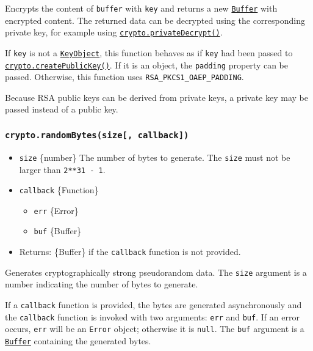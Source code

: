 Encrypts the content of \texttt{buffer} with \texttt{key} and returns a
new \href{buffer.md}{\texttt{Buffer}} with encrypted content. The
returned data can be decrypted using the corresponding private key, for
example using
\hyperref[cryptoprivatedecryptprivatekey-buffer]{\texttt{crypto.privateDecrypt()}}.

If \texttt{key} is not a \hyperref[class-keyobject]{\texttt{KeyObject}},
this function behaves as if \texttt{key} had been passed to
\hyperref[cryptocreatepublickeykey]{\texttt{crypto.createPublicKey()}}.
If it is an object, the \texttt{padding} property can be passed.
Otherwise, this function uses \texttt{RSA\_PKCS1\_OAEP\_PADDING}.

Because RSA public keys can be derived from private keys, a private key
may be passed instead of a public key.

\subsubsection{\texorpdfstring{\texttt{crypto.randomBytes(size{[},\ callback{]})}}{crypto.randomBytes(size{[}, callback{]})}}\label{crypto.randombytessize-callback}

\begin{itemize}
\tightlist
\item
  \texttt{size} \{number\} The number of bytes to generate. The
  \texttt{size} must not be larger than \texttt{2**31\ -\ 1}.
\item
  \texttt{callback} \{Function\}

  \begin{itemize}
  \tightlist
  \item
    \texttt{err} \{Error\}
  \item
    \texttt{buf} \{Buffer\}
  \end{itemize}
\item
  Returns: \{Buffer\} if the \texttt{callback} function is not provided.
\end{itemize}

Generates cryptographically strong pseudorandom data. The \texttt{size}
argument is a number indicating the number of bytes to generate.

If a \texttt{callback} function is provided, the bytes are generated
asynchronously and the \texttt{callback} function is invoked with two
arguments: \texttt{err} and \texttt{buf}. If an error occurs,
\texttt{err} will be an \texttt{Error} object; otherwise it is
\texttt{null}. The \texttt{buf} argument is a
\href{buffer.md}{\texttt{Buffer}} containing the generated bytes.


